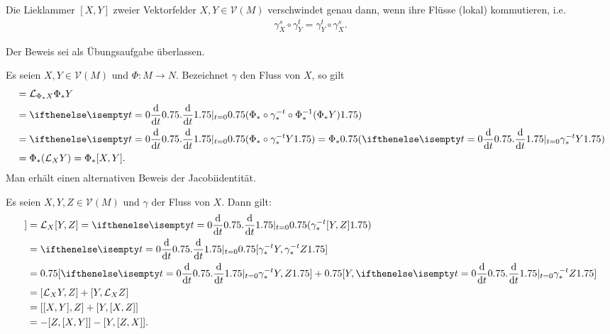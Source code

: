 
\begin{Satz}
  Die Lieklammer $[X,Y]$ zweier Vektorfelder $X,Y \in \mathcal V(M)$ verschwindet genau dann, wenn ihre Flüsse (lokal) kommutieren, i.e.
  \begin{align*}
    \gamma_X^s \circ \gamma_Y^t = \gamma_Y^t \circ \gamma_X^s.
  \end{align*}
\end{Satz}

Der Beweis sei als Übungsaufgabe überlassen.

Es seien $X,Y \in \mathcal V(M)$ und $\Phi \colon M \to N$.
Bezeichnet $\gamma$ den Fluss von $X$, so gilt
\begin{align*}
  [\Phi_{\ast}X,\Phi_{\ast}Y] & = \mathcal L_{\Phi_{\ast}X} \Phi_{\ast}Y\\
  & = \difffrac[t=0]{}{t}\left(\Phi_{\ast} \circ \gamma_{\ast}^{-t} \circ \Phi_{\ast}^{-1}(\Phi_{\ast}Y)\right)\\
  & = \difffrac[t=0]{}{t} \left(\Phi_{\ast} \circ \gamma_{\ast}^{-t}Y\right) 
  = \Phi_{\ast}\left(\difffrac[t=0]{}{t}\gamma_{\ast}^{-t}Y\right)\\
  & = \Phi_{\ast}(\mathcal L_XY) = \Phi_{\ast}[X,Y].
\end{align*}
Man erhält einen alternativen Beweis der Jacobiidentität.


\begin{bew}
  Es seien $X,Y, Z \in \mathcal V(M)$ und $\gamma$ der Fluss von $X$.
  Dann gilt:
  \begin{align*}
    [X,[Y,Z]] & = \mathcal L_X[Y,Z] 
    = \difffrac[t=0]{}{t}\left(\gamma_{\ast}^{-t}[Y,Z]\right)\\
    & = \difffrac[t=0]{}{t}\left[\gamma_{\ast}^{-t}Y,\gamma_{\ast}^{-t}Z\right]\\
    & = \left[\difffrac[t=0]{}{t} \gamma_{\ast}^{-t}Y,Z\right] + \left[Y, \difffrac[t=0]{}{t}\gamma_{\ast}^{-t}Z\right]\\
    & = [\mathcal L_XY,Z] + [Y,\mathcal L_XZ]\\
    & = [[X,Y],Z] + [Y,[X,Z]]\\
    & = -[Z,[X,Y]] - [Y,[Z,X]].
  \end{align*}
\end{bew}

